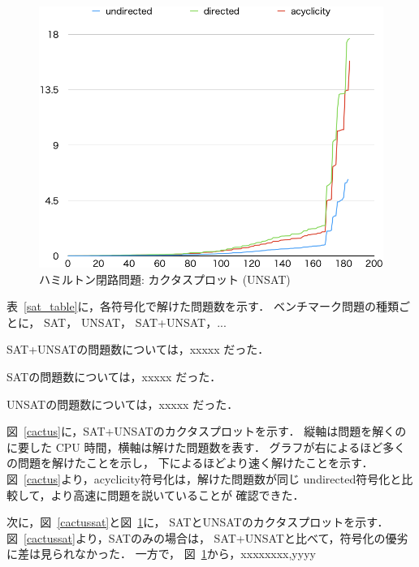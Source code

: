 \begin{figure}[tb]
\begin{center}
\includegraphics[width=0.6\linewidth]{fig/cactusunsat.png}
\caption{ハミルトン閉路問題: カクタスプロット (\textsf{UNSAT})}
\label{cactusunsat}
\end{center}
\end{figure}

表~\ref{sat_table}に，各符号化で解けた問題数を示す．
ベンチマーク問題の種類ごとに，
\textsf{SAT}，
\textsf{UNSAT}，
\textsf{SAT+UNSAT}，...


\textsf{SAT+UNSAT}の問題数については，xxxxx だった．

\textsf{SAT}の問題数については，xxxxx だった．

\textsf{UNSAT}の問題数については，xxxxx だった．


図~\ref{cactus}に，\textsf{SAT+UNSAT}のカクタスプロットを示す．
縦軸は問題を解くのに要した CPU 時間，横軸は解けた問題数を表す．
グラフが右によるほど多くの問題を解けたことを示し，
下によるほどより速く解けたことを示す．
図~\ref{cactus}より，\textsf{acyclicity}符号化は，解けた問題数が同じ
\textsf{undirected}符号化と比較して，より高速に問題を説いていることが
確認できた．

次に，図~\ref{cactussat}と図~\ref{cactusunsat}に，
\textsf{SAT}と\textsf{UNSAT}のカクタスプロットを示す．
図~\ref{cactussat}より，\textsf{SAT}のみの場合は，
\textsf{SAT+UNSAT}と比べて，符号化の優劣に差は見られなかった．
一方で，
図~\ref{cactusunsat}から，xxxxxxxx,yyyy




